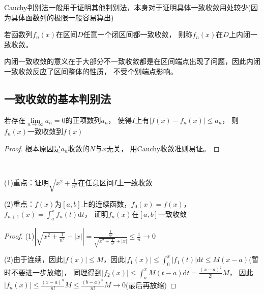 \begin{note}
  Cauchy判别法一般用于证明其他判别法，本身对于证明具体一致收敛用处较少(因为具体函数列的极限一般容易算出)
\end{note}

\begin{definition}[内闭一致收敛]
  若函数列$f_n(x)$在区间$D$任意一个闭区间都一致收敛，
  则称$f_n(x)$在$D$上内闭一致收敛。
\end{definition}

\begin{note}
  内闭一致收敛的意义在于大部分不一致收敛都是在区间端点出现了问题，因此内闭一致收敛反应了区间整体的性质，
  不受个别端点影响。
\end{note}


\subsection{一致收敛的基本判别法}

\begin{theorem}[Weiestrass判别法]
  若存在$\lim \limits _{n \rightarrow \infty} a_n = 0$的正项数列$a_n$，
  使得$I$上有$|f(x) - f_n(x)| \leq a_n$，
  则$f_n(x)$一致收敛到$f(x)$
\end{theorem}

\begin{proof}
  根本原因是$a_n$收敛的$N$与$x$无关，
  用Cauchy收敛准则易证。
\end{proof}

~

\begin{exercise}[M判别法的使用]
  (1)重点：证明$\sqrt{x^2 + \frac{1}{n^2}}$在任意区间$I$上一致收敛

  (2)重点：$f(x)$为$[a,b]$上的连续函数，$f_0(x) = f(x)$，$f_{n+1}(x) = \int_a^x f_n(t)\mathrm{d} t$，
  证明$f_n(x)$在$[a,b]$一致收敛
\end{exercise}

\begin{proof}
  (1)$\left|\sqrt{x^2 + \frac{1}{n^2}} - |x|\right| = \frac{\frac{1}{n^2}}{\sqrt{x^2 + \frac{1}{n^2}} + |x|} \leq \frac{1}{n} \rightarrow 0$

  (2)由于连续，因此$|f(x)| \leq M$，因此$|f_1(x)| \leq \int_0^x |f_1(t)| \mathrm{d} t \leq M(x - a)$(暂时不要进一步放缩)，
  同理得到$|f_2(x)| \leq \int_a^x M(t - a)\mathrm{d} t = \frac{(x - a)^2}{2!}M$，
  因此$|f_n(x)| \leq \frac{(x-a)^n}{n!}M \leq \frac{(b - a)^n }{n!}M \rightarrow 0$(最后再放缩)
\end{proof}

